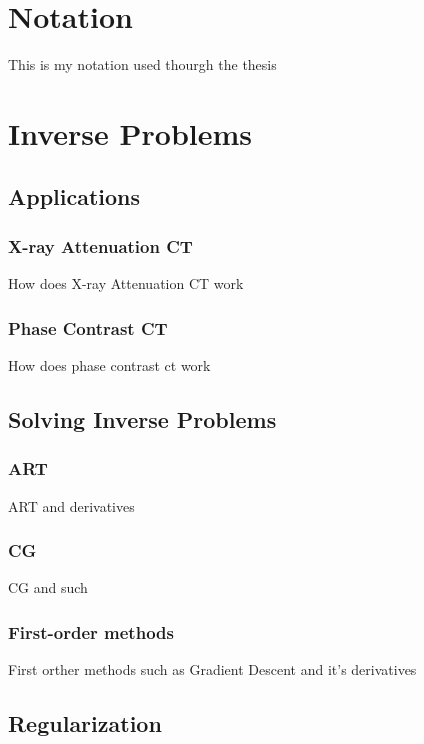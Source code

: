 \chapter{Notation}

This is my notation used thourgh the thesis

\chapter{Inverse Problems}

\section{Applications}
 
\subsection{X-ray Attenuation CT}

How does X-ray Attenuation CT work

\subsection{Phase Contrast CT}

How does phase contrast ct work

\section{Solving Inverse Problems}
 
\subsection{ART}

ART and derivatives

\subsection{CG}

CG and such
 
\subsection{First-order methods}

First orther methods such as Gradient Descent and it's derivatives

\section{Regularization}

